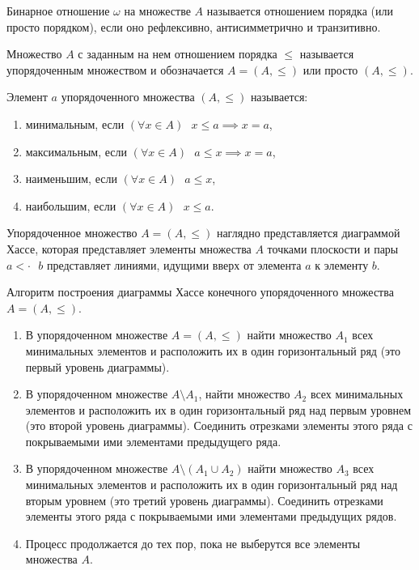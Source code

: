 \documentclass[spec, och, labwork]{shiza}
\begin{document}
Бинарное отношение $\omega$ на множестве $A$ называется отношением порядка (или просто порядком), если оно
рефлексивно, антисимметрично и транзитивно.

Множество $A$ с заданным на нем отношением порядка $\leq$ называется упорядоченным множеством и обозначается $A
= (A, \leq)$ или просто $(A, \leq)$.

Элемент $a$ упорядоченного множества $(A, \leq)$ называется:
\begin{enumerate}
    \item минимальным, если $(\forall x \in A) \text{ } x \leq a \implies x = a$,
    \item максимальным, если $(\forall x \in A) \text{ } a \leq x \implies x = a$,
    \item наименьшим, если $(\forall x \in A) \text{ } a \leq x$,
    \item наибольшим, если $(\forall x \in A) \text{ } x \leq a$.
\end{enumerate}

Упорядоченное множество $A = (A, \leq)$ наглядно представляется диаграммой Хассе, которая представляет элементы множества $A$ точками плоскости и пары $a <\cdot \text{ } b$ представляет линиями, идущими вверх от элемента $a$ к элементу $b$.

Алгоритм построения диаграммы Хассе конечного упорядоченного множества $A = (A, \leq)$.

\begin{enumerate}
    \item В упорядоченном множестве $A = (A, \leq)$ найти множество $A_1$ всех минимальных элементов и расположить их в один горизонтальный ряд (это первый уровень диаграммы).
    \item В упорядоченном множестве $A \setminus A_1$, найти множество $A_2$ всех минимальных элементов и
    расположить их в один горизонтальный ряд над первым уровнем (это второй уровень диаграммы). Соединить
    отрезками элементы этого ряда с покрываемыми ими элементами предыдущего ряда.
    \item В упорядоченном множестве $A \setminus (A_1 \cup A_2)$ найти множество $A_3$ всех минимальных
    элементов и расположить их в один горизонтальный ряд над вторым уровнем (это третий уровень диаграммы).
    Соединить отрезками элементы этого ряда с покрываемыми ими элементами предыдущих рядов.
    \item Процесс продолжается до тех пор, пока не выберутся все элементы множества $A$.
\end{enumerate}
\end{document}
